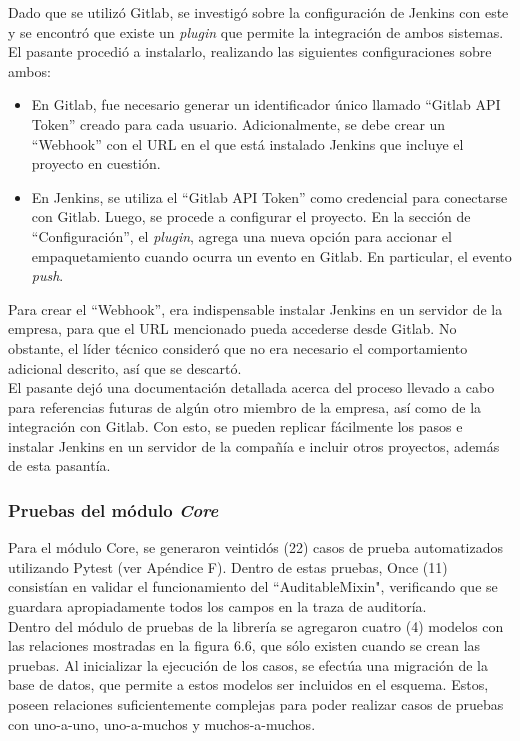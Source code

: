 Dado que se utilizó Gitlab, se investigó sobre la configuración de Jenkins con este y se encontró que existe un \textit{plugin} que permite la integración de ambos sistemas. El pasante procedió a instalarlo, realizando las siguientes configuraciones sobre ambos:

\begin{itemize}
    \item En Gitlab, fue necesario generar un identificador único llamado “Gitlab API Token” creado para cada usuario. Adicionalmente, se debe crear un “Webhook” con el URL en el que está instalado Jenkins que incluye el proyecto en cuestión.
    \item En Jenkins, se utiliza el “Gitlab API Token” como credencial para conectarse con Gitlab. Luego, se procede a configurar el proyecto. En la sección de “Configuración”, el \textit{plugin}, agrega una nueva opción para accionar el empaquetamiento cuando ocurra un evento en Gitlab. En particular, el evento \textit{push}.
\end{itemize}


Para crear el “Webhook”, era indispensable instalar Jenkins en un servidor de la empresa, para que el URL mencionado pueda accederse desde Gitlab. No obstante, el líder técnico consideró que no era necesario el comportamiento adicional descrito, así que se descartó.\\

El pasante dejó una documentación detallada acerca del proceso llevado a cabo para referencias futuras de algún otro miembro de la empresa, así como de la integración con Gitlab. Con esto, se pueden replicar fácilmente los pasos e instalar Jenkins en un servidor de la compañía e incluir otros proyectos, además de esta pasantía.

\subsubsection{Pruebas del módulo \textit{Core}}

Para el módulo Core, se generaron veintidós (22) casos de prueba automatizados utilizando Pytest (ver Apéndice F). Dentro de estas pruebas, Once (11) consistían en validar el funcionamiento del “AuditableMixin", verificando que se guardara apropiadamente todos los campos en la traza de auditoría. \\

Dentro del módulo de pruebas de la librería se agregaron cuatro (4) modelos con las relaciones mostradas en la figura 6.6, que sólo existen cuando se crean las pruebas. Al inicializar la ejecución de los casos, se efectúa una migración de la base de datos, que permite a estos modelos ser incluidos en el esquema. Estos, poseen relaciones suficientemente complejas para poder realizar casos de pruebas con uno-a-uno, uno-a-muchos y muchos-a-muchos.

